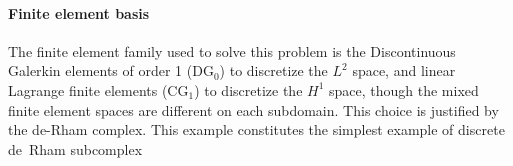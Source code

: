 \documentclass[11pt,a4paper]{article}
\begin{document}
{\paragraph{Finite element basis}
The finite element family used to solve this problem is the Discontinuous Galerkin elements of order 1 (DG$_0$) to discretize the $L^2$ space, and linear Lagrange finite elements (CG$_1$) to discretize the $H^1$ space, though the mixed finite element spaces are different on each subdomain. This choice is justified by the de-Rham complex. This example constitutes the simplest example of discrete de~Rham subcomplex
}
\begin{center}
\end{center}
\end{document}
